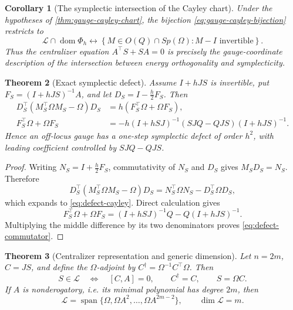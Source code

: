 \documentclass[11pt,a4paper]{article}
\newtheorem{theorem}{Theorem}[section]
\newtheorem{corollary}[theorem]{Corollary}
\newcommand{\cL}{\mathcal L}
\newcommand{\Span}{\operatorname{span}}
\begin{document}
\begin{corollary}[The symplectic intersection of the Cayley chart]
\label{cor:cayley-symplectic-intersection}
Under the hypotheses of \cref{thm:gauge-cayley-chart}, the bijection
\cref{eq:gauge-cayley-bijection} restricts to
\[
 \cL\cap\operatorname{dom}\Phi_h
 \longleftrightarrow
 \left\{M\in O(Q)\cap Sp(\Omega):M-I\text{ invertible}\right\}.
\]
Thus the centralizer equation \(A^\top S+SA=0\) is precisely the
gauge-coordinate description of the intersection between energy
orthogonality and symplecticity.
\end{corollary}

\begin{theorem}[Exact symplectic defect]\label{thm:defect}
Assume \(I+hJS\) is invertible, put
\(F_S=(I+hJS)^{-1}A\), and let \(D_S=I-\tfrac h2F_S\). Then
\begin{align}
 D_S^\top(M_S^\top\Omega M_S-\Omega)D_S
 &=h(F_S^\top\Omega+\Omega F_S),\label{eq:defect-cayley}\\
 F_S^\top\Omega+\Omega F_S
 &=-h(I+hSJ)^{-1}(SJQ-QJS)(I+hJS)^{-1}.
 \label{eq:defect-commutator}
\end{align}
Hence an off-locus gauge has a one-step symplectic defect of order
\(h^2\), with leading coefficient controlled by \(SJQ-QJS\).
\end{theorem}

\begin{proof}
Writing \(N_S=I+\tfrac h2F_S\), commutativity of \(N_S\) and \(D_S\)
gives \(M_SD_S=N_S\). Therefore
\[
 D_S^\top(M_S^\top\Omega M_S-\Omega)D_S
 =N_S^\top\Omega N_S-D_S^\top\Omega D_S,
\]
which expands to \cref{eq:defect-cayley}. Direct calculation gives
\[
 F_S^\top\Omega+\Omega F_S
 =(I+hSJ)^{-1}Q-Q(I+hJS)^{-1}.
\]
Multiplying the middle difference by its two denominators proves
\cref{eq:defect-commutator}.
\end{proof}

\begin{theorem}[Centralizer representation and generic dimension]
\label{thm:generic-dimension}
Let \(n=2m\), \(C=JS\), and define the \(\Omega\)-adjoint by
\(C^\dagger=\Omega^{-1}C^\top\Omega\). Then
\begin{equation}\label{eq:centralizer}
 S\in\cL
 \quad\Longleftrightarrow\quad
 [C,A]=0,\qquad C^\dagger=C,\qquad S=\Omega C.
\end{equation}
If \(A\) is nonderogatory, i.e. its minimal polynomial has degree \(2m\),
then
\begin{equation}\label{eq:generic-basis}
 \cL=\Span\{\Omega,\Omega A^2,\ldots,\Omega A^{2m-2}\},
 \qquad \dim\cL=m.
\end{equation}
\end{theorem}
\end{document}
